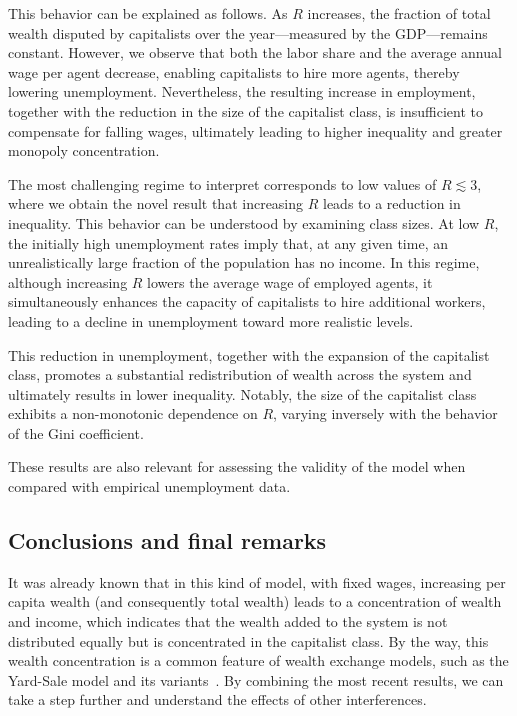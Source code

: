 This behavior can be explained as follows. As $R$ increases, the fraction of total wealth disputed by capitalists over the year—measured by the GDP—remains constant. However, we observe that both the labor share and the average annual wage per agent decrease, 
enabling capitalists to hire more agents, thereby lowering unemployment. Nevertheless, the resulting increase in employment, together with the reduction in the size of the capitalist class, is insufficient to compensate for falling wages, ultimately leading to higher inequality and greater monopoly concentration.

 The most challenging regime to interpret corresponds to low values of $R\lesssim 3$, where we obtain the novel result that increasing $R$ leads to a reduction in inequality. This behavior can be understood by examining class sizes. At low  $R$,
the initially high unemployment rates imply that, at any given time, an unrealistically large fraction of the population has no income. In this regime, although increasing $R$ lowers the average wage of employed agents, it simultaneously enhances the capacity of capitalists to hire additional workers, leading to a decline in unemployment toward more realistic levels.

This reduction in unemployment, together with the expansion of the capitalist class, promotes a substantial redistribution of wealth across the system and ultimately results in lower inequality. Notably, the size of the capitalist class exhibits a non-monotonic dependence on $R$, varying inversely with the behavior of the Gini coefficient.
 
These results are also relevant for assessing the validity of the model when compared with empirical unemployment data.

\subsection{Conclusions and final remarks}
\label{sec:final}

It was already known that in this kind of model, with fixed wages, increasing per capita wealth (and consequently total wealth) leads to a concentration of wealth and income, which indicates that the wealth added to the system is not distributed equally but is concentrated in the capitalist class. By the way, this wealth concentration is a common feature of wealth exchange models, such as the Yard-Sale  model and its variants~\cite{yakovenko2023,chakraborti2011,boghosian2014a,chakrabarti2013,boghosian2014}.  By combining the most recent results, we can take a step further and understand the effects of other interferences.


